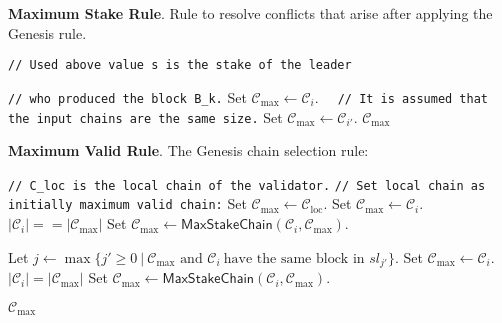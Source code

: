 \bigbreak
\noindent
\textbf{Maximum Stake Rule}.
Rule to resolve conflicts that arise after applying the Genesis rule.
\begin{algo}
    \caption{${\textsf{MaxStakeChain}(\mathcal{C}_i}, \mathcal{C}_{i'})$}
    \begin{algorithmic}[1]

            \noindent
            \lstinline|// Used above value s is the stake of the leader|

            \noindent
            \lstinline|// who produced the block B_k.|
            \State Set ${\mathcal{C}_{\max} \leftarrow \mathcal{C}_{i}}$.
        \Else
            \noindent
            \lstinline|  // It is assumed that the input chains are the same size.|
            \State Set ${\mathcal{C}_{\max} \leftarrow \mathcal{C}_{i'}}$.
        \EndIf
        \State \Return ${\mathcal{C}_{\max}}$
    \end{algorithmic}\label{alg:algorithm-2}
\end{algo}

\bigbreak
\bigbreak
\noindent
\textbf{Maximum Valid Rule}.
The Genesis chain selection rule:
\begin{algo}
    \caption{${\textsf{MaxValidChain}(\mathcal{C}_{\text{loc}}, C_{\text{set}} = \{\mathcal{C}_i\}_{i=1}^N, K_{\text{f}}, K_{\text{g}})}$}
    \begin{algorithmic}[1]
        \noindent
        \lstinline|// C_loc is the local chain of the validator.|
        \noindent
        \lstinline|// Set local chain as initially maximum valid chain:|
        \State Set ${\mathcal{C}_{\max} \leftarrow \mathcal{C}_{\text{loc}}}$.
                    \State Set ${\mathcal{C}_{\max} \leftarrow \mathcal{C}_{i}}$.
                \ElsIf
                        {$|\mathcal{C}_i| == |\mathcal{C}_{\max}|$}
                    \State Set ${\mathcal{C}_{\max} \leftarrow \textsf{MaxStakeChain}(\mathcal{C}_{i}, \mathcal{C}_{\max})}$.

                \EndIf
            \Else

                \State Let ${j  \leftarrow \max \{j' \geq 0 \ |\  \mathcal{C}_{\max} \text{ and } \mathcal{C}_{i} \
                \text{have the same block in } sl_{j'}\}}$.
                    \State Set ${\mathcal{C}_{\max} \leftarrow \mathcal{C}_{i}}$.
                \ElsIf
                        {$|\mathcal{C}_i| = |\mathcal{C}_{\max}|$}
                    \State Set ${\mathcal{C}_{\max} \leftarrow \textsf{MaxStakeChain}(\mathcal{C}_{i}, \mathcal{C}_{\max})}$.
                \EndIf
            \EndIf

        \EndFor
        \State \Return ${\mathcal{C}_{\max}}$
    \end{algorithmic}\label{alg:algorithm-10}
\end{algo}


